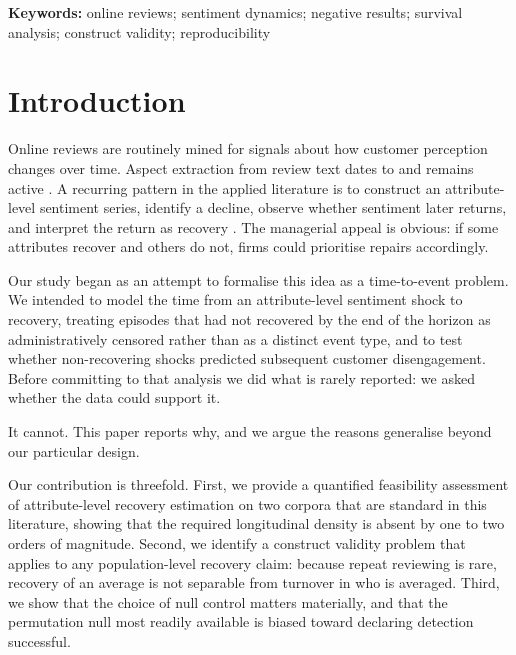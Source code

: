 \documentclass[11pt,a4paper]{article}
\makeatletter
\let\original@section\section
\renewcommand{\section}{\FloatBarrier\original@section}%
\makeatother
\begin{document}
\vspace{4pt}
\noindent{}

\vspace{6pt}
\noindent\textbf{Keywords:} online reviews; sentiment dynamics; negative
results; survival analysis; construct validity; reproducibility

\section{Introduction}

Online reviews are routinely mined for signals about how customer perception
changes over time. Aspect extraction from review text dates to \citet{hu2004} and remains
active \citep{zhou2023}. A recurring pattern in the applied literature is to
construct an attribute-level sentiment series, identify a decline, observe
whether sentiment later returns, and interpret the return as recovery
\citep{park2024, roelen2023, yang2023}. The
managerial appeal is obvious: if some attributes recover and others do not,
firms could prioritise repairs accordingly.

Our study began as an attempt to formalise this idea as a time-to-event
problem. We intended to model the time from an attribute-level sentiment shock to
recovery, treating episodes that had not recovered by the end of the horizon as
administratively censored rather than as a distinct event type, and to test
whether non-recovering shocks predicted subsequent customer disengagement. Before
committing to that analysis we did what is rarely reported: we asked whether
the data could support it.

It cannot. This paper reports why, and we argue the reasons generalise beyond
our particular design.

Our contribution is threefold. First, we provide a quantified feasibility
assessment of attribute-level recovery estimation on two corpora that are
standard in this literature, showing that the required longitudinal density is
absent by one to two orders of magnitude. Second, we identify a construct
validity problem that applies to any population-level recovery claim: because
repeat reviewing is rare, recovery of an average is not separable from
turnover in who is averaged. Third, we show that the choice of null control
matters materially, and that the permutation null most readily available is
biased toward declaring detection successful.
\end{document}
